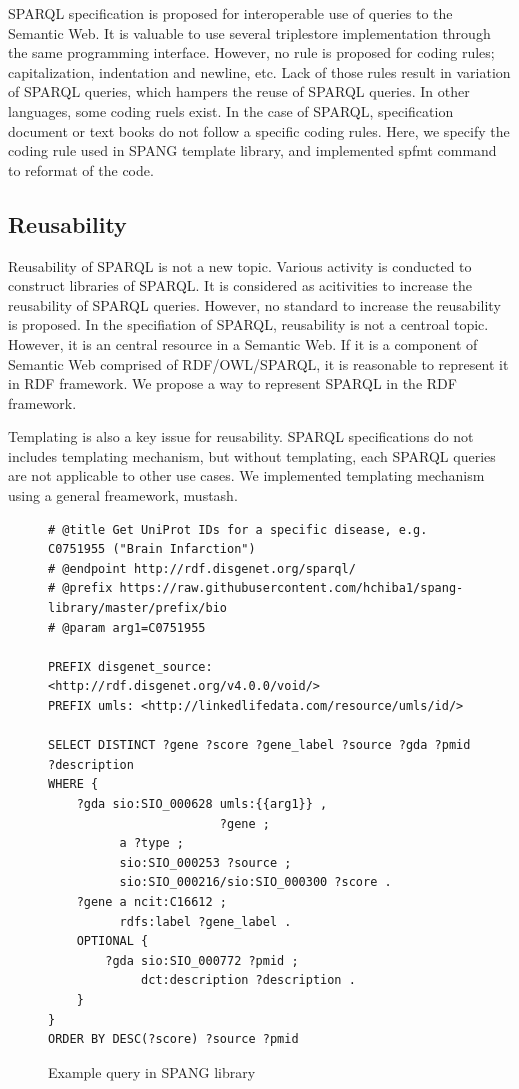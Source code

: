\documentclass[runningheads]{llncs}
\begin{document}
SPARQL specification is proposed for interoperable use of queries to the Semantic Web. It is valuable to use several triplestore implementation through the same programming interface. However, no rule is proposed for coding rules; capitalization, indentation and newline, etc. Lack of those rules result in variation of SPARQL queries, which hampers the reuse of SPARQL queries. In other languages, some coding ruels exist. In the case of SPARQL, specification document or text books do not follow a specific coding rules. Here, we specify the coding rule used in SPANG template library, and implemented spfmt command to reformat of the code.

\subsection{Reusability}
Reusability of SPARQL is not a new topic. Various activity is conducted to construct libraries of SPARQL. It is considered as acitivities to increase the reusability of SPARQL queries. However, no standard to increase the reusability is proposed. In the specifiation of SPARQL, reusability is not a centroal topic. However, it is an central resource in a Semantic Web. If it is a component of Semantic Web comprised of RDF/OWL/SPARQL, it is reasonable to represent it in RDF framework. We propose a way to represent SPARQL in the RDF framework.

Templating is also a key issue for reusability. SPARQL specifications do not includes templating mechanism, but without templating, each SPARQL queries are not applicable to other use cases. We implemented templating mechanism using a general freamework, mustash.




\begin{figure}[!t]
\begin{scriptsize}
\begin{verbatim}
# @title Get UniProt IDs for a specific disease, e.g. C0751955 ("Brain Infarction")
# @endpoint http://rdf.disgenet.org/sparql/
# @prefix https://raw.githubusercontent.com/hchiba1/spang-library/master/prefix/bio
# @param arg1=C0751955 

PREFIX disgenet_source: <http://rdf.disgenet.org/v4.0.0/void/>
PREFIX umls: <http://linkedlifedata.com/resource/umls/id/>

SELECT DISTINCT ?gene ?score ?gene_label ?source ?gda ?pmid ?description
WHERE {
    ?gda sio:SIO_000628 umls:{{arg1}} ,
                        ?gene ;
          a ?type ;
          sio:SIO_000253 ?source ;
          sio:SIO_000216/sio:SIO_000300 ?score .
    ?gene a ncit:C16612 ;
          rdfs:label ?gene_label .
    OPTIONAL {
        ?gda sio:SIO_000772 ?pmid ;
             dct:description ?description .
    }
}
ORDER BY DESC(?score) ?source ?pmid

\end{verbatim}
\end{scriptsize}
\caption{Example query in SPANG library}
\label{fig:example-rdf}
\end{figure}
\end{document}
